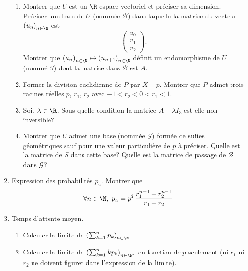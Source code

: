 \begin{enumerate}
\begin{enumerate}
 \item Montrer que $U$ est un $\R$-espace vectoriel et préciser sa dimension. Préciser une base de $U$ (nommée $\mathcal{B}$) dans laquelle la matrice du vecteur $\left( u_n \right)_{n \in \N}$ est 
\begin{displaymath}
 \begin{pmatrix}
  u_0 \\ u_1 \\ u_2
 \end{pmatrix}
.
\end{displaymath}
Montrer que $ \left( u_n \right)_{n \in \N} \mapsto \left( u_{n+1} \right)_{n \in \N}$ définit un endomorphisme de $U$ (nommé $S$) dont la matrice dans $\mathcal{B}$ est $A$.

 \item Former la division euclidienne de $P$ par $X-p$. Montrer que $P$ admet trois racines réelles $p$, $r_1$, $r_2$ avec $-1 < r_2 < 0 < r_1 <1$.
 
 \item Soit $\lambda \in \R$. Sous quelle condition la matrice $A-\lambda I_3$ est-elle non inversible?
 
 \item Montrer que $U$ admet une base (nommée $\mathcal{G}$) formée de suites géométriques sauf pour une valeur particulière de $p$ à préciser. Quelle est la matrice de $S$ dans cette base? Quelle est la matrice de passage de $\mathcal{B}$ dans $\mathcal{G}$?
 
\end{enumerate}

\item Expression des probabilités $p_n$.\newline
Montrer que 
\begin{displaymath}
\forall n \in \N, \; p_n = p^{2}\, \frac{r_1^{n-1}-r_2^{n-1}}{r_1 - r_2} 
\end{displaymath}


\item Temps d'attente moyen.
\begin{enumerate}
 \item Calculer la limite de $\left( \sum_{k=1}^{n}p_k \right)_{n \in \N^*}$.
 \item Calculer la limite de $\left( \sum_{k=1}^{n} kp_k \right)_{n \in \N^*}$ en fonction de $p$ seulement (ni $r_1$ ni $r_2$ ne doivent figurer dans l'expression de la limite).
\end{enumerate}

\end{enumerate}

